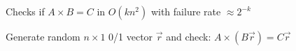 Checks if $A \times B = C$ in $O(kn^2)$ with failure rate $\approx 2^{-k}$

Generate random $n \times 1$ 0/1 vector $\vec{r}$ and check:
$A \times (B\vec{r}) = C\vec{r}$
